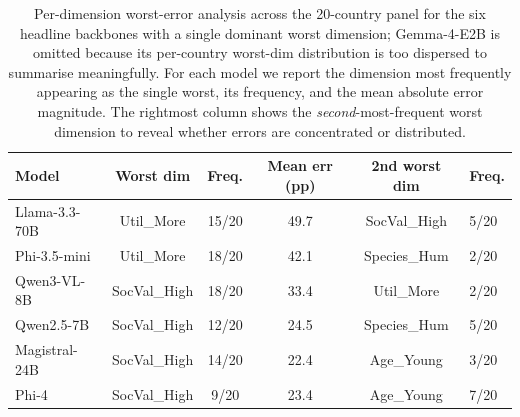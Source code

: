 \documentclass{article}
\begin{document}
\begin{table}[H]\centering\scriptsize
\caption{Per-dimension worst-error analysis across the 20-country panel for the six headline backbones with a single dominant worst dimension; Gemma-4-E2B is omitted because its per-country worst-dim distribution is too dispersed to summarise meaningfully. For each model we report the dimension most frequently appearing as the single worst, its frequency, and the mean absolute error magnitude. The rightmost column shows the \emph{second}-most-frequent worst dimension to reveal whether errors are concentrated or distributed.}
\label{tab:perdim_summary}
\setlength{\tabcolsep}{3pt}
\begin{tabular}{lccccl}\toprule
Model & Worst dim & Freq. & Mean err (pp) & 2nd worst dim & Freq. \\\midrule
Llama-3.3-70B   & Util\_More    & 15/20 & 49.7 & SocVal\_High & 5/20 \\
Phi-3.5-mini    & Util\_More    & 18/20 & 42.1 & Species\_Hum & 2/20 \\
Qwen3-VL-8B     & SocVal\_High  & 18/20 & 33.4 & Util\_More   & 2/20 \\
Qwen2.5-7B      & SocVal\_High  & 12/20 & 24.5 & Species\_Hum & 5/20 \\
Magistral-24B   & SocVal\_High  & 14/20 & 22.4 & Age\_Young   & 3/20 \\
Phi-4           & SocVal\_High  &  9/20 & 23.4 & Age\_Young   & 7/20 \\
\bottomrule
\end{tabular}
\end{table}
\end{document}
